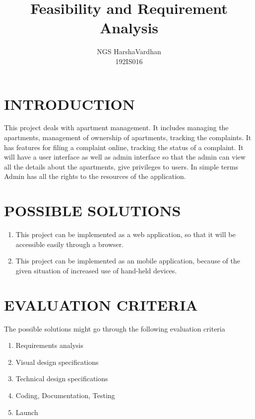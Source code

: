 \documentclass[a4paper, 10pt, conference]{ieeeconf}
\title{\LARGE \bf
Feasibility and Requirement Analysis
}
\author{NGS HarshaVardhan\\192IS016}
\begin{document}
\maketitle
\thispagestyle{empty}
\pagestyle{empty}


\section{INTRODUCTION}

This project deals with apartment management. It includes managing the apartments, management of ownership of apartments, tracking the complaints. It has features for filing a complaint online, tracking the status of a complaint. It will have a user interface as well as admin interface so that the admin can view all the details about the apartments, give privileges to users. In simple terms Admin has all the rights to the resources of the application.

\section{POSSIBLE SOLUTIONS}

\begin{enumerate}
    \item This project can be implemented as a web application, so that it will be accessible easily through a browser.
    
    \item This project can be implemented as an mobile application, because of the given situation of increased use of hand-held devices.

\end{enumerate}

\section{EVALUATION CRITERIA}
The possible solutions might go through the following evaluation criteria

\begin{enumerate}
    \item Requirements analysis
    \item Visual design specifications
    \item Technical design specifications
    \item Coding, Documentation, Testing
    \item Launch
\end{enumerate}
\end{document}
